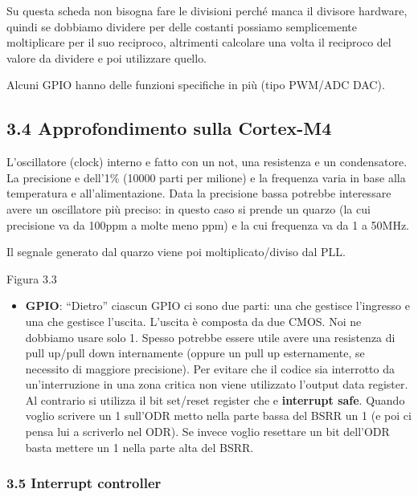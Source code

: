 \documentclass[
]{article}
\providecommand{\tightlist}{%
  \setlength{\itemsep}{0pt}\setlength{\parskip}{0pt}}
\begin{document}
Su questa scheda non bisogna fare le divisioni perché manca il divisore
hardware, quindi se dobbiamo dividere per delle costanti possiamo
semplicemente moltiplicare per il suo reciproco, altrimenti calcolare
una volta il reciproco del valore da dividere e poi utilizzare quello.

Alcuni GPIO hanno delle funzioni specifiche in più (tipo PWM/ADC DAC).

\subsection{3.4 Approfondimento sulla
Cortex-M4}\label{approfondimento-sulla-cortex-m4}

L'oscillatore (clock) interno e fatto con un not, una resistenza e un
condensatore. La precisione e dell'1\% (10000 parti per milione) e la
frequenza varia in base alla temperatura e all'alimentazione. Data la
precisione bassa potrebbe interessare avere un oscillatore più preciso:
in questo caso si prende un quarzo (la cui precisione va da 100ppm a
molte meno ppm) e la cui frequenza va da 1 a 50MHz.

Il segnale generato dal quarzo viene poi moltiplicato/diviso dal PLL.

Figura 3.3

\begin{itemize}
\tightlist
\item
  \textbf{GPIO}: ``Dietro'' ciascun GPIO ci sono due parti: una che
  gestisce l'ingresso e una che gestisce l'uscita. \newline L'uscita è
  composta da due CMOS. Noi ne dobbiamo usare solo 1. Spesso potrebbe
  essere utile avere una resistenza di pull up/pull down internamente
  (oppure un pull up esternamente, se necessito di maggiore precisione).
  Per evitare che il codice sia interrotto da un'interruzione in una
  zona critica non viene utilizzato l'output data register. \newline Al
  contrario si utilizza il bit set/reset register che e
  \textbf{interrupt safe}. \newline Quando voglio scrivere un 1 sull'ODR
  metto nella parte bassa del BSRR un 1 (e poi ci pensa lui a scriverlo
  nel ODR). Se invece voglio resettare un bit dell'ODR basta mettere un
  1 nella parte alta del BSRR.
\end{itemize}

\subsubsection{3.5 Interrupt controller}\label{interrupt-controller}
\end{document}
